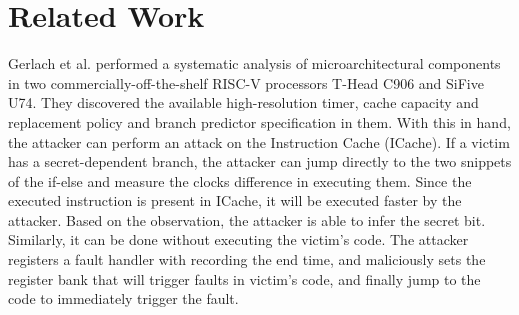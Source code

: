 \section{Related Work}
Gerlach et al.\cite{a-secure-risc} performed a systematic analysis of microarchitectural components in two commercially-off-the-shelf RISC-V processors T-Head C906 and SiFive U74. They discovered the available high-resolution timer, cache capacity and replacement policy and branch predictor specification in them.
With this in hand, the attacker can perform an attack on the Instruction Cache (ICache). If a victim has a secret-dependent branch, the attacker can jump directly to the two snippets of the if-else and measure the clocks difference in executing them. Since the executed instruction is present in ICache, it will be executed faster by the attacker. Based on the observation, the attacker is able to infer the secret bit. Similarly, it can be done without executing the victim's code. The attacker registers a fault handler with recording the end time, and maliciously sets the register bank that will trigger faults in victim's code, and finally jump to the code to immediately trigger the fault.
